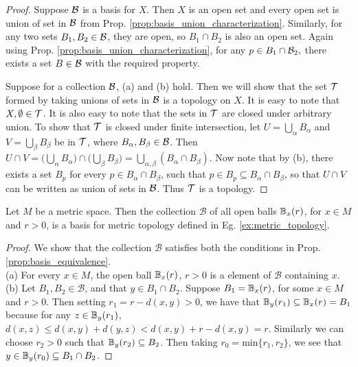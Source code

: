 \documentclass[11pt,a4paper]{article}
\begin{document}
\begin{proof}
\forward Suppose $\mathcal{B}$ is a basis for $X$. Then $X$ is an open set and every open set is union of set in $\mathcal{B}$ from Prop. \ref{prop:basis_union_characterization}. Similarly, for any two sets $B_1, B_2\in \mathcal{B}$, they are open, so $B_1\cap B_2$ is also an open set. Again using Prop. \ref{prop:basis_union_characterization}, for any $p\in B_1\cap \mathcal{B}_2,$ there exists a set $B\in \mathcal{B}$ with the required property.

\converse Suppose for a collection $\mathcal{B}$, (a) and (b) hold. Then we will show that the set $\mathcal{T}$ formed by taking unions of sets in $\mathcal{B}$ is a topology on $X$. It is easy to note that $X,\emptyset\in \mathcal{T}$. It is also easy to note that the sets in $\mathcal{T}$ are closed under arbitrary union. To show that $\mathcal{T}$ is closed under finite intersection, let $U = \bigcup_{\alpha} B_\alpha$ and $V = \bigcup_{\beta}B_\beta$ be in $\mathcal{T}$, where $B_\alpha, B_\beta\in \mathcal{B}$. Then $U\cap V = \Big(\bigcup_{\alpha}B_\alpha\Big) \cap \Big(\bigcup_{\beta}B_\beta\Big) = \bigcup_{\alpha,\beta} (B_\alpha\cap B_\beta)$. Now note that by (b), there exists a set $B_p$ for every $p\in B_\alpha\cap B_\beta$, such that $p\in B_p\subseteq B_\alpha\cap B_\beta$, so that $U\cap V$ can be written as union of sets in $\mathcal{B}$. Thus $\mathcal{T}$ is a topology.
\end{proof}

\begin{prop}
Let $M$ be a metric space. Then the collection $\mathcal{B}$ of all open balls $\mathbb{B}_x(r)$, for $x\in M$ and $r>0$, is a basis for metric topology defined in Eg. \ref{ex:metric_topology}.
\end{prop}

\begin{proof}
We show that the collection $\mathcal{B}$ satisfies both the conditions in Prop. \ref{prop:basis_equivalence}. \\
(a) For every $x\in M$, the open ball $\mathbb{B}_x(r)$, $r>0$ is a element of $\mathcal{B}$ containing $x$.\\
(b) Let $B_1, B_2\in\mathcal{B}$, and that $y\in B_1\cap B_2$. Suppose $B_1 = \mathbb{B}_x(r)$, for some $x\in M$ and $r>0$. Then setting $r_1 = r-d(x,y)>0$, we have that $\mathbb{B}_y(r_1)\subseteq \mathbb{B}_x(r) = B_1$ because for any $z\in \mathbb{B}_y(r_1)$, $d(x,z)\le d(x,y)+d(y,z) < d(x,y) + r - d(x,y) = r$. Similarly we can choose $r_2>0$ such that $\mathbb{B}_y(r_2)\subseteq B_2$. Then taking $r_0 = \text{min}\{r_1,r_2\}$, we see that $y\in \mathbb{B}_y(r_0)\subseteq B_1\cap B_2$.
\end{proof}
\end{document}
